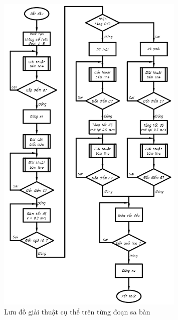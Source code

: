                \begin{figure}[H]
                    \centering
                    \includegraphics[width=0.8\textwidth]{pictures/chapter7/flow3.png}
                    \caption{Lưu đồ giải thuật cụ thể trên từng đoạn sa bàn}
                    \label{flow2}
               \end{figure}



